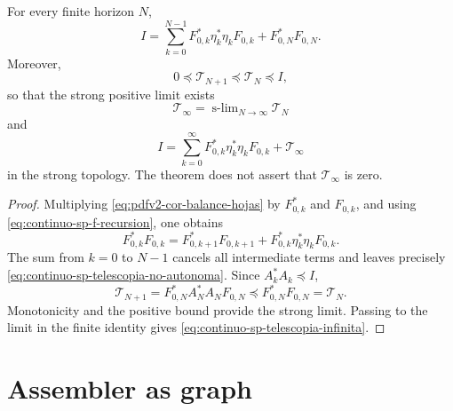 \begin{theorem}
\label{thm:continuo-sp-telescopia-no-autonoma}
For every finite horizon \(N\),
\begin{equation}
\label{eq:continuo-sp-telescopia-no-autonoma}
 \boxed{
 I=\sum_{k=0}^{N-1}
 F_{0,k}^*\eta_k^*\eta_kF_{0,k}
 +F_{0,N}^*F_{0,N}.}
\end{equation}
Moreover,
\[
 0\preceq\mathcal T_{N+1}
 \preceq\mathcal T_N\preceq I,
\]
so that the strong positive limit exists
\[
 \mathcal T_\infty
 =\operatorname{s-lim}_{N\to\infty}\mathcal T_N
\]
and
\begin{equation}
\label{eq:continuo-sp-telescopia-infinita}
 I=\sum_{k=0}^{\infty}
 F_{0,k}^*\eta_k^*\eta_kF_{0,k}
 +\mathcal T_\infty
\end{equation}
in the strong topology. The theorem does not assert that
\(\mathcal T_\infty\) is zero.
\end{theorem}

\begin{proof}
Multiplying \eqref{eq:pdfv2-cor-balance-hojas} by
\(F_{0,k}^*\) and \(F_{0,k}\), and using
\eqref{eq:continuo-sp-f-recursion}, one obtains
\[
 F_{0,k}^*F_{0,k}
 =F_{0,k+1}^*F_{0,k+1}
  +F_{0,k}^*\eta_k^*\eta_kF_{0,k}.
\]
The sum from \(k=0\) to \(N-1\) cancels all intermediate
terms and leaves precisely
\eqref{eq:continuo-sp-telescopia-no-autonoma}. Since
\(A_k^*A_k\preceq I\),
\[
 \mathcal T_{N+1}
 =F_{0,N}^*A_N^*A_NF_{0,N}
 \preceq F_{0,N}^*F_{0,N}=\mathcal T_N.
\]
Monotonicity and the positive bound provide the strong limit. Passing to the
limit in the finite identity gives
\eqref{eq:continuo-sp-telescopia-infinita}.
\end{proof}

\iffalse
\section{Assembler as graph}

